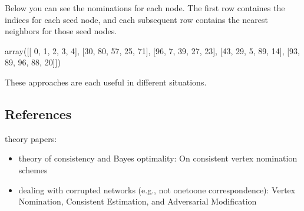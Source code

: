 \documentclass[letterpaper,10pt,english]{jupyterBook}
\begin{document}
\begin{sphinxVerbatim}[commandchars=\\\{\}]
   

  

   
\end{sphinxVerbatim}

\sphinxAtStartPar
Below you can see the nominations for each node. The first row containes the indices for each seed node, and each subsequent row contains the nearest neighbors for those seed nodes.

\begin{sphinxVerbatim}[commandchars=\\\{\}]
\end{sphinxVerbatim}

\begin{sphinxVerbatim}[commandchars=\\\{\}]
array([[ 0,  1,  2,  3,  4],
       [30, 80, 57, 25, 71],
       [96,  7, 39, 27, 23],
       [43, 29,  5, 89, 14],
       [93, 89, 96, 88, 20]])
\end{sphinxVerbatim}

\noindent{}

\sphinxAtStartPar
These approaches are each useful in different situations.


\subsection{References}
\label{\detokenize{applications/ch8/single-vertex-nomination:references}}
\sphinxAtStartPar
theory papers:
\begin{itemize}
\item {} 
\sphinxAtStartPar
theory of consistency and Bayes optimality: On consistent vertex nomination schemes

\item {} 
\sphinxAtStartPar
dealing with corrupted networks (e.g., not one\sphinxhyphen{}to\sphinxhyphen{}one correspondence): Vertex Nomination, Consistent Estimation, and Adversarial Modification

\end{itemize}
\end{document}
